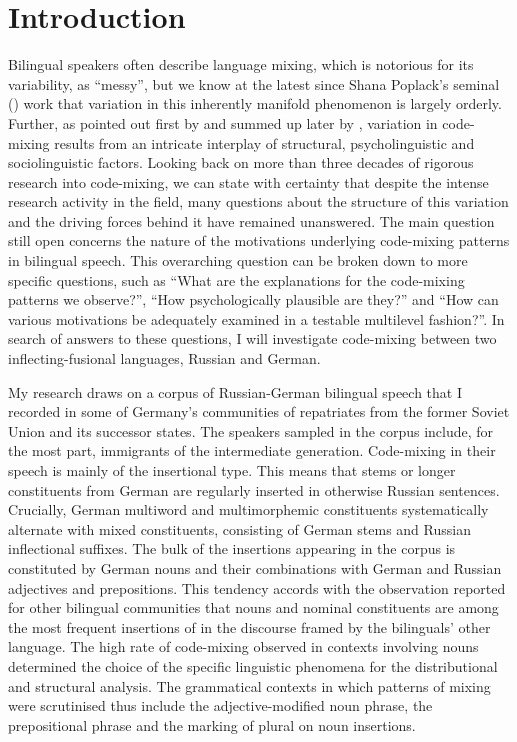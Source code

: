 \chapter*{Introduction} %

Bilingual speakers often describe language mixing, which is notorious for its variability, as “messy”, but we know at the latest since Shana Poplack's seminal (\citeyear{poplack-sometimes-1980}) work that variation in this inherently manifold phenomenon is largely orderly. Further, as pointed out first by \citet{bokamba89} and summed up later by \citet[][487]{muysken-etal96}, variation in code-mixing results from an intricate interplay of structural, psycholinguistic and sociolinguistic factors. Looking back on more than three decades of rigorous research into code-mixing, we can state with certainty that despite the intense research activity in the field, many questions about the structure of this variation and the driving forces behind it have remained unanswered. The main question still open concerns the nature of the motivations underlying code-mixing patterns in bilingual speech. This overarching question can be broken down to more specific questions, such as ``What are the explanations for the code-mixing patterns we observe?'', ``How psychologically plausible are they?'' and ``How can various motivations be adequately examined in a testable multilevel fashion?''. In search of answers to these questions, I will investigate code-mixing between two inflecting-fusional languages, Russian and German.

My research draws on a corpus of Russian-German bilingual speech that I recorded in some of Germany's communities of repatriates from the former Soviet Union and its successor states. The speakers sampled in the corpus include, for the most part, immigrants of the intermediate generation. Code-mixing in their speech is mainly of the insertional type. This means that stems or longer constituents from German are regularly inserted in otherwise Russian sentences. Crucially, German multiword and multimorphemic constituents systematically alternate with mixed constituents, consisting of German stems and Russian inflectional suffixes. The bulk of the insertions appearing in the corpus is constituted by German nouns and their combinations with German and Russian adjectives and prepositions. This tendency accords with the observation reported for other bilingual communities that nouns and nominal constituents are among the most frequent insertions of in the discourse framed by the bilinguals' other language. The high rate of code-mixing observed in  contexts involving nouns determined the choice of the specific linguistic phenomena for the distributional and structural analysis. The grammatical contexts in which patterns of mixing were scrutinised thus include the adjective-modified noun phrase, the prepositional phrase and the marking of plural on noun insertions. 

